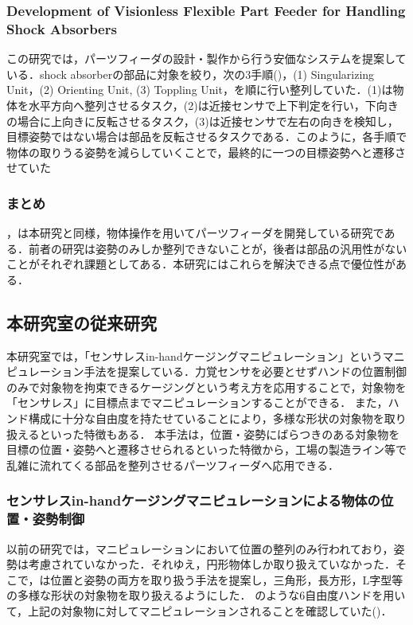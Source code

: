 \documentclass[a4paper,twoside,12pt,papersize, dvipdfmx]{iirthesis}
\begin{document}
\subsubsection{Development of Visionless Flexible Part Feeder for Handling Shock Absorbers \cite{Udhayakumar}}
この研究では，パーツフィーダの設計・製作から行う安価なシステムを提案している．shock absorberの部品に対象を絞り，次の3手順()，(1) Singularizing Unit，(2) Orienting Unit, (3) Toppling Unit，を順に行い整列していた．(1)は物体を水平方向へ整列させるタスク，(2)は近接センサで上下判定を行い，下向きの場合に上向きに反転させるタスク，(3)は近接センサで左右の向きを検知し，目標姿勢ではない場合は部品を反転させるタスクである．このように，各手順で物体の取りうる姿勢を減らしていくことで，最終的に一つの目標姿勢へと遷移させていた

\subsubsection{まとめ}
\cite{Akella}，\cite{Udhayakumar}は本研究と同様，物体操作を用いてパーツフィーダを開発している研究である．前者の研究は姿勢のみしか整列できないことが，後者は部品の汎用性がないことがそれぞれ課題としてある．本研究にはこれらを解決できる点で優位性がある．

\subsection{本研究室の従来研究}
本研究室では，「センサレスin-handケージングマニピュレーション」というマニピュレーション手法を提案している．力覚センサを必要とせずハンドの位置制御のみで対象物を拘束できるケージングという考え方を応用することで，対象物を「センサレス」に目標点までマニピュレーションすることができる．
また，ハンド構成に十分な自由度を持たせていることにより，多様な形状の対象物を取り扱えるといった特徴もある．
本手法は，位置・姿勢にばらつきのある対象物を目標の位置・姿勢へと遷移させられるといった特徴から，工場の製造ライン等で乱雑に流れてくる部品を整列させるパーツフィーダへ応用できる．

\subsubsection{センサレスin-handケージングマニピュレーションによる物体の位置・姿勢制御 \cite{Komiyama2021}}
以前の研究では，マニピュレーションにおいて位置の整列のみ行われており，姿勢は考慮されていなかった．それゆえ，円形物体しか取り扱えていなかった．そこで，\cite{Komiyama2021}は位置と姿勢の両方を取り扱う手法を提案し，三角形，長方形，L字型等の多様な形状の対象物を取り扱えるようにした．
\figref{}のような6自由度ハンドを用いて，上記の対象物に対してマニピュレーションされることを確認していた(\figref{})．
\end{document}
